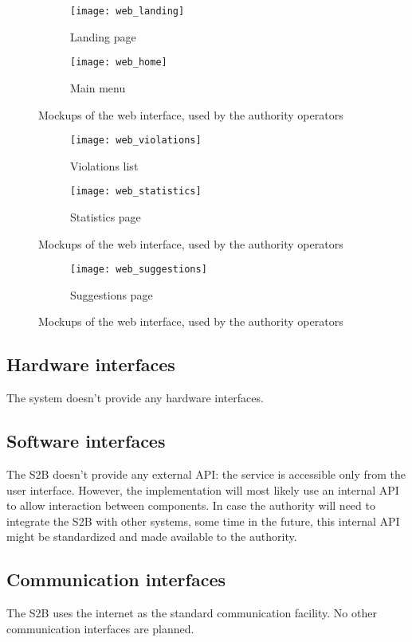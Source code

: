 \begin{figure}[ht]
    \centering
    \begin{subfigure}{\textwidth}
        \texttt{[image: web\_landing]}
        \caption{Landing page}
    \end{subfigure}

    \begin{subfigure}{\textwidth}
        \texttt{[image: web\_home]}
        \caption{Main menu}
    \end{subfigure}

    \caption{Mockups of the web interface, used by the authority operators}
    \label{fig:mockups_web}
\end{figure}
\begin{figure}[ht]\ContinuedFloat
    \centering
    \begin{subfigure}{\textwidth}
        \texttt{[image: web\_violations]}
        \caption{Violations list}
    \end{subfigure}
    
    \begin{subfigure}{\textwidth}
        \texttt{[image: web\_statistics]}
        \caption{Statistics page}
    \end{subfigure}

    \caption{Mockups of the web interface, used by the authority operators}
\end{figure}
\clearpage %
\begin{figure}[ht]\ContinuedFloat
    \centering
    \begin{subfigure}{\textwidth}
        \texttt{[image: web\_suggestions]}
        \caption{Suggestions page}
    \end{subfigure}

    \caption{Mockups of the web interface, used by the authority operators}
\end{figure}

\subsection{Hardware interfaces}
The system doesn't provide any hardware interfaces.

\subsection{Software interfaces}
The S2B doesn't provide any external API: the service is accessible only
from the user interface.
However, the implementation will most likely use an internal API to allow
interaction between components.
In case the authority will need to integrate the S2B with other systems, some
time in the future, this internal API might be standardized and made available
to the authority.

\subsection{Communication interfaces}
The S2B uses the internet as the standard communication facility.
No other communication interfaces are planned.
